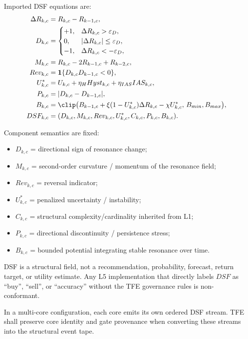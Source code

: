 Imported DSF equations are:
\begin{align*}
\Delta R_{k,c} &= R_{k,c}-R_{k-1,c},\\
D_{k,c} &= \begin{cases}+1,& \Delta R_{k,c}>\varepsilon_D,\\0,& |\Delta R_{k,c}|\le \varepsilon_D,\\-1,& \Delta R_{k,c}< -\varepsilon_D,\end{cases}\\
M_{k,c} &= R_{k,c}-2R_{k-1,c}+R_{k-2,c},\\
Rev_{k,c} &= \mathbf{1}\{D_{k,c}D_{k-1,c}<0\},\\
U^{\ast}_{k,c} &= U_{k,c} + \eta_HHyst_{k,c} + \eta_{IAS}IAS_{k,c},\\
P_{k,c} &= |D_{k,c}-D_{k-1,c}|,\\
B_{k,c} &= \clip\big(B_{k-1,c}+\xi(1-U^{\ast}_{k,c})\Delta R_{k,c}-\chi U^{\ast}_{k,c},\,B_{min},B_{max}\big),\\
DSF_{k,c} &= (D_{k,c},M_{k,c},Rev_{k,c},U^{\ast}_{k,c},C_{k,c},P_{k,c},B_{k,c}).
\end{align*}

Component semantics are fixed:
\begin{itemize}
    \item $D_{k,c}$ = directional sign of resonance change;
    \item $M_{k,c}$ = second-order curvature / momentum of the resonance field;
    \item $Rev_{k,c}$ = reversal indicator;
    \item $U^{\ast}_{k,c}$ = penalized uncertainty / instability;
    \item $C_{k,c}$ = structural complexity/cardinality inherited from L1;
    \item $P_{k,c}$ = directional discontinuity / persistence stress;
    \item $B_{k,c}$ = bounded potential integrating stable resonance over time.
\end{itemize}

DSF is a structural field, not a recommendation, probability, forecast, return target, or utility estimate. Any L5 implementation that directly labels $DSF$ as ``buy'', ``sell'', or ``accuracy'' without the TFE governance rules is non-conformant.

In a multi-core configuration, each core emits its own ordered DSF stream. TFE shall preserve core identity and gate provenance when converting these streams into the structural event tape.


